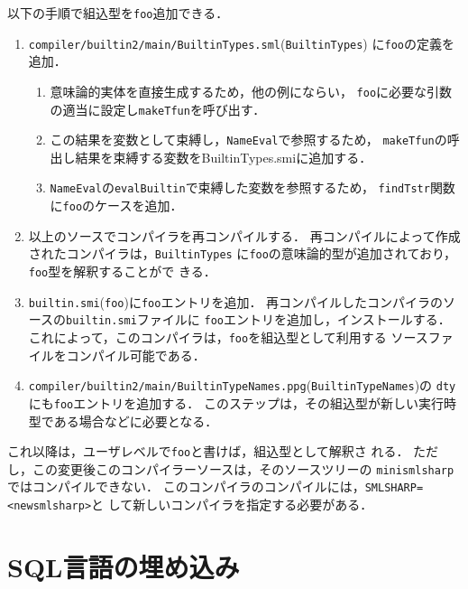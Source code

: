 \documentclass{jbook}
\newcommand{\txt}[2]{#1}
\newcommand{\code}[1]{\mbox{\large\tt #1}}
\newcommand{\module}[2]{\code{#1}(\code{#2})}
\begin{document}
\begin{enumerate}
	以下の手順で組込型を\code{foo}追加できる．
\begin{enumerate}
\item \module{compiler/builtin2/main/BuiltinTypes.sml}{BuiltinTypes}
に\code{foo}の定義を追加．
\begin{enumerate}
\item 意味論的実体を直接生成するため，他の例にならい，
\code{foo}に必要な引数の適当に設定し\code{makeTfun}を呼び出す．
\item この結果を変数として束縛し，\code{NameEval}で参照するため，
\code{makeTfun}の呼出し結果を束縛する変数を{BuiltinTypes.smi}に追加する．
\item \code{NameEval}の\code{evalBuiltin}で束縛した変数を参照するため，
\code{findTstr}関数に\code{foo}のケースを追加．
\end{enumerate}
\item 以上のソースでコンパイラを再コンパイルする．
	再コンパイルによって作成されたコンパイラは，\code{BuiltinTypes}
に\code{foo}の意味論的型が追加されており，\code{foo}型を解釈することがで
きる．
\item \module{builtin.smi}{foo}に\code{foo}エントリを追加．
	再コンパイルしたコンパイラのソースの\code{builtin.smi}ファイルに
\code{foo}エントリを追加し，インストールする．
	これによって，このコンパイラは，\code{foo}を組込型として利用する
ソースファイルをコンパイル可能である．
\item \module{compiler/builtin2/main/BuiltinTypeNames.ppg}{BuiltinTypeNames}の
\code{dty}にも\code{foo}エントリを追加する．
	このステップは，その組込型が新しい実行時型である場合などに必要となる．
\end{enumerate}
	これ以降は，ユーザレベルで\code{foo}と書けば，組込型として解釈さ
れる．
	ただし，この変更後このコンパイラーソースは，そのソースツリーの
\code{minismlsharp}ではコンパイルできない．
	このコンパイラのコンパイルには，\code{SMLSHARP=<newsmlsharp>}と
して新しいコンパイラを指定する必要がある．
\end{enumerate}


\chapter{\txt
{SQL言語の埋め込み}
{SQL Integration}
}
\label{chap:sqlintegration}
\end{document}
